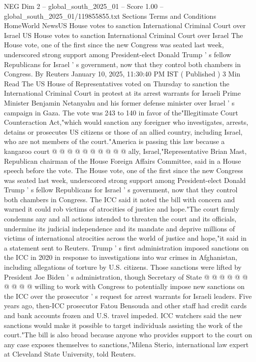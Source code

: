 \begin{textsample}{NEG Dim 2 – global\_south\_2025\_01 – Score 1.00 – global\_south\_2025\_01/119855855.txt}  \label{ex:f2_neg_133}
Sections Terms and Conditions HomeWorld NewsUS House votes to sanction International Criminal Court over Israel US House votes to sanction International Criminal Court over Israel The House vote, one of the first since the new Congress was seated last week, underscored strong support among President-elect Donald Trump ' s fellow Republicans for Israel ' s government, now that they control both chambers in Congress.
By Reuters January 10, 2025, 11:30:40 PM IST ( Published ) 3 Min Read The US House of Representatives voted on Thursday to sanction the International Criminal Court in protest at its arrest warrants for Israeli Prime Minister Benjamin Netanyahu and his former defense minister over Israel ' s campaign in Gaza.
The vote was 243 to 140 in favor of the"Illegitimate Court Counteraction Act,"which would sanction any foreigner who investigates, arrests, detains or prosecutes US citizens or those of an allied country, including Israel, who are not members of the court."America is passing this law because a kangaroo court @ @ @ @ @ @ @ @ @ @ ally, Israel,"Representative Brian Mast, Republican chairman of the House Foreign Affairs Committee, said in a House speech before the vote.
The House vote, one of the first since the new Congress was seated last week, underscored strong support among President-elect Donald Trump ' s fellow Republicans for Israel ' s government, now that they control both chambers in Congress.
The ICC said it noted the bill with concern and warned it could rob victims of atrocities of justice and hope."The court firmly condemns any and all actions intended to threaten the court and its officials, undermine its judicial independence and its mandate and deprive millions of victims of international atrocities across the world of justice and hope,"it said in a statement sent to Reuters.
Trump ' s first administration imposed sanctions on the ICC in 2020 in response to investigations into war crimes in Afghanistan, including allegations of torture by U.S. citizens.
Those sanctions were lifted by President Joe Biden ' s administration, though Secretary of State @ @ @ @ @ @ @ @ @ @ willing to work with Congress to potentially impose new sanctions on the ICC over the prosecutor ' s request for arrest warrants for Israeli leaders.
Five years ago, then-ICC prosecutor Fatou Bensouda and other staff had credit cards and bank accounts frozen and U.S. travel impeded.
ICC watchers said the new sanctions would make it possible to target individuals assisting the work of the court."The bill is also broad because anyone who provides support to the court on any case exposes themselves to sanctions,"Milena Sterio, international law expert at Cleveland State University, told Reuters.

\end{textsample}
